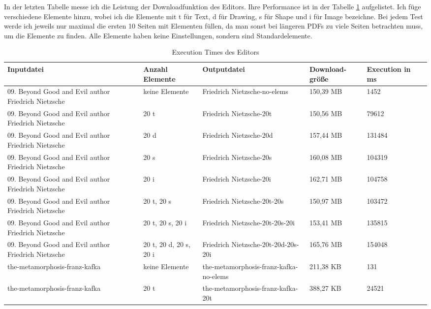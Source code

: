In der letzten Tabelle messe ich die Leistung der Downloadfunktion des Editors. Ihre Performance ist in der Tabelle \ref{table:editor-dur} aufgelistet. Ich füge verschiedene Elemente hinzu, wobei ich die Elemente mit t für Text, d für Drawing, s für Shape und i für Image bezeichne. Bei jedem Test werde ich jeweils nur maximal die ersten 10 Seiten mit Elementen füllen, da man sonst bei längeren PDFs zu viele Seiten betrachten muss, um die Elemente zu finden. Alle Elemente haben keine Einstellungen, sondern sind Standardelemente.

\begin{table}[!htbp]
	\centering
	\begin{tabular}{|p{3cm}|p{2cm}|p{3cm}|p{2cm}|p{2cm}|p{2cm}|}
		\hline
		\textbf{Inputdatei}					& \textbf{Anzahl Elemente}			& \textbf{Outputdatei}								& \textbf{Download-größe}	& \textbf{Execution in ms} 	\\ 
		\hline
		09. Beyond Good and Evil author Friedrich Nietzsche		& keine Elemente 					& Friedrich Nietzsche-no-elems			& 150,39 MB					& 1452     					\\
		09. Beyond Good and Evil author Friedrich Nietzsche		& 20 t 								& Friedrich Nietzsche-20t		& 150,56 MB					& 79612   					\\
		09. Beyond Good and Evil author Friedrich Nietzsche		& 20 d 								& Friedrich Nietzsche-20d				& 157,44 MB					& 131484  					\\
		09. Beyond Good and Evil author Friedrich Nietzsche		& 20 s 								& Friedrich Nietzsche-20s				& 160,08 MB					& 104319    					\\
		09. Beyond Good and Evil author Friedrich Nietzsche		& 20 i 								& Friedrich Nietzsche-20i				& 162,71 MB					& 104758   					\\
		09. Beyond Good and Evil author Friedrich Nietzsche		& 20 t, 20 s 						& Friedrich Nietzsche-20t-20s			& 150,97 MB					& 103472  					\\
		09. Beyond Good and Evil author Friedrich Nietzsche	& 20 t, 20 s, 20 i 				& Friedrich Nietzsche-20t-20s-20i	& 153,41 MB					& 135815     					\\
		09. Beyond Good and Evil author Friedrich Nietzsche		& 20 t, 20 d, 20 s, 20 i 			& Friedrich Nietzsche-20t-20d-20s-20i	& 165,76 MB					& 154048   					\\
		the-metamorphosis-franz-kafka		& keine Elemente 					& the-metamorphosis-franz-kafka-no-elems			& 211,38 KB					& 131    						\\
		the-metamorphosis-franz-kafka		& 20 t 								& the-metamorphosis-franz-kafka-20t					& 388,27 KB					& 24521    					\\
		\hline
	\end{tabular}
	\caption{Execution Times des Editors}
	\label{table:editor-dur}
\end{table}